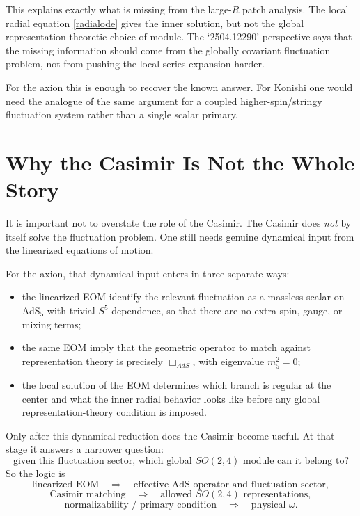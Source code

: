 \documentclass[12pt]{article}
\begin{document}
This explains exactly what is missing from the large-$R$ patch analysis.  The local radial equation
\eqref{radialode} gives the inner solution, but not the global representation-theoretic choice of module.
The `2504.12290' perspective says that the missing information should come from the globally covariant
fluctuation problem, not from pushing the local series expansion harder.

For the axion this is enough to recover the known answer.  For Konishi one would need the analogue of the
same argument for a coupled higher-spin/stringy fluctuation system rather than a single scalar primary.

\section{Why the Casimir Is Not the Whole Story}

It is important not to overstate the role of the Casimir.  The Casimir does \emph{not} by itself solve the
fluctuation problem.  One still needs genuine dynamical input from the linearized equations of motion.

For the axion, that dynamical input enters in three separate ways:
\begin{itemize}
\item the linearized EOM identify the relevant fluctuation as a massless scalar on AdS$_5$ with trivial
      $S^5$ dependence, so that there are no extra spin, gauge, or mixing terms;
\item the same EOM imply that the geometric operator to match against representation theory is precisely
      $\Box_{AdS}$, with eigenvalue $m_5^2=0$;
\item the local solution of the EOM determines which branch is regular at the center and what the inner
      radial behavior looks like before any global representation-theory condition is imposed.
\end{itemize}

Only after this dynamical reduction does the Casimir become useful.  At that stage it answers a narrower
question:
\begin{equation}
\text{given this fluctuation sector, which global } SO(2,4)\text{ module can it belong to?}
\end{equation}
So the logic is
\begin{equation}
\text{linearized EOM}
\quad \Longrightarrow \quad
\text{effective AdS operator and fluctuation sector},
\end{equation}
\begin{equation}
\text{Casimir matching}
\quad \Longrightarrow \quad
\text{allowed } SO(2,4)\text{ representations},
\end{equation}
\begin{equation}
\text{normalizability / primary condition}
\quad \Longrightarrow \quad
\text{physical } \omega.
\end{equation}
\end{document}
